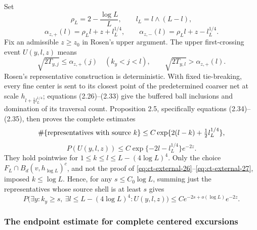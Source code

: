 Set
\[
\rho_L=2-\frac{\log L}{L},\qquad l_L=l\wedge(L-l),
\]
\begin{equation}
\alpha_{z,+}(l)=\rho_Ll+z+l_L^{1/4},\qquad
 \alpha_{z,-}(l)=\rho_Ll+z-l_L^{1/4}.\label{eq:ct-external-25}
\end{equation}
Fix an admissible $z\ge z_0$ in Rosen's upper argument.  The upper
first-crossing event $U(y,l,z)$ means
\[
\sqrt{2T_{y,j}}\le\alpha_{z,+}(j)
       \quad(k_y<j<l),\qquad
 \sqrt{2T_{y,l}}>\alpha_{z,+}(l).
\]
Rosen's representative construction is deterministic.  With fixed
tie-breaking, every fine center is sent to its closest point of the
predetermined coarser net at scale
$h_{l+\frac14 l_L^{1/4}}$; equations (2.26)--(2.33) give the buffered
ball inclusions and domination of its traversal count.  Proposition 2.5,
specifically equations (2.34)--(2.35), then proves the complete estimates
\begin{equation}
\#\{\hbox{representatives with source }k\}
 \le C\exp\{2(l-k)+\tfrac12l_L^{1/4}\},\label{eq:ct-external-26}
\end{equation}
\begin{equation}
P(U(y,l,z))\le
 C\exp\{-2l-l_L^{1/4}\}e^{-2z}.\label{eq:ct-external-27}
\end{equation}
They hold pointwise for $1\le k\le l\le L-(4\log L)^4$.
Only the choice $F_L\cap B_d(v,h_{\log L})^c$, and not the proof of
\eqref{eq:ct-external-26}--\eqref{eq:ct-external-27}, imposed $k\le\log L$.  Hence, for any
$s\le C_0\log L$, summing just the representatives whose source shell
is at least $s$ gives
\begin{equation}
P\big(\exists y:k_y\ge s,\ \exists l\le L-(4\log L)^4:
              U(y,l,z)\big)
       \le C e^{-2s+o(\log L)}e^{-2z}.\label{eq:ct-external-28}
\end{equation}

\subsubsection{The endpoint estimate for complete centered excursions}

